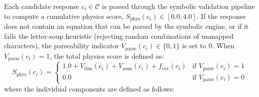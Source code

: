 \documentclass[a4paper,fleqn]{cas-sc}
\begin{document}
Each candidate response $c_i \in \mathcal{C}$ is passed through the symbolic validation pipeline to compute a cumulative physics score, $S_{\mathrm{phys}}(c_i) \in [0.0, 4.0]$. If the response does not contain an equation that can be parsed by the symbolic engine, or if it fails the letter-soup heuristic (rejecting random combinations of unmapped characters), the parseability indicator $V_{\mathrm{parse}}(c_i) \in \{0, 1\}$ is set to $0$. When $V_{\mathrm{parse}}(c_i) = 1$, the total physics score is defined as:
\begin{equation*}
S_{\mathrm{phys}}(c_i) = \begin{cases}
1.0 + V_{\mathrm{dim}}(c_i) + V_{\mathrm{num}}(c_i) + f_{\mathrm{cov}}(c_i) & \text{if } V_{\mathrm{parse}}(c_i) = 1 \\
0.0 & \text{if } V_{\mathrm{parse}}(c_i) = 0
\end{cases}
\end{equation*}
where the individual components are defined as follows:
\end{document}
